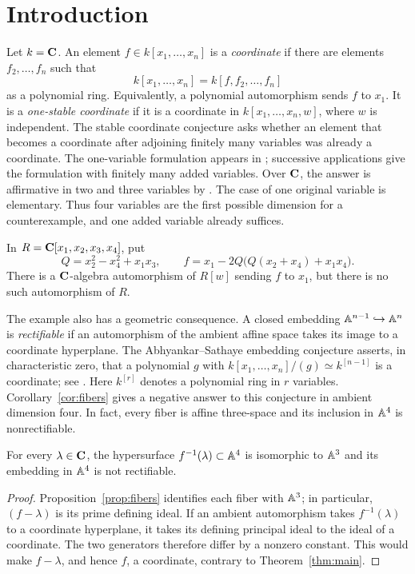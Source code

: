 \section{Introduction}\label{sec:introduction}
Let $k=\mathbf C$. An element $f\in k[x_1,\ldots,x_n]$ is a \emph{coordinate} if there are elements $f_2,\ldots,f_n$ such that
\[
 k[x_1,\ldots,x_n]=k[f,f_2,\ldots,f_n]
\]
as a polynomial ring. Equivalently, a polynomial automorphism sends $f$ to $x_1$. It is a \emph{one-stable coordinate} if it is a coordinate in $k[x_1,\ldots,x_n,w]$, where $w$ is independent. The stable coordinate conjecture asks whether an element that becomes a coordinate after adjoining finitely many variables was already a coordinate. The one-variable formulation appears in \cite[Conjecture~3]{ShpilrainYu2002}; successive applications give the formulation with finitely many added variables. Over $\mathbf C$, the answer is affirmative in two and three variables by \cite[Proposition~1.1(c)]{ShpilrainYu2002}. The case of one original variable is elementary. Thus four variables are the first possible dimension for a counterexample, and one added variable already suffices.

\begin{theorem}\label{thm:main}
In $R=\mathbf C[x_1,x_2,x_3,x_4]$, put
\begin{equation}\label{eq:explicit-counterexample}
 Q=x_2^2-x_4^2+x_1x_3,
 \qquad
 f=x_1-2Q\bigl(Q(x_2+x_4)+x_1x_4\bigr).
\end{equation}
There is a $\mathbf C$-algebra automorphism of $R[w]$ sending $f$ to $x_1$, but there is no such automorphism of $R$.
\end{theorem}

The example also has a geometric consequence. A closed embedding $\mathbb A^{n-1}\hookrightarrow\mathbb A^n$ is \emph{rectifiable} if an automorphism of the ambient affine space takes its image to a coordinate hyperplane. The Abhyankar--Sathaye embedding conjecture asserts, in characteristic zero, that a polynomial $g$ with $k[x_1,\ldots,x_n]/(g)\simeq k^{[n-1]}$ is a coordinate; see \cite[p.~8429]{BlancVanSanten2019}. Here $k^{[r]}$ denotes a polynomial ring in $r$ variables. Corollary~\ref{cor:fibers} gives a negative answer to this conjecture in ambient dimension four. In fact, every fiber is affine three-space and its inclusion in $\mathbb A^4$ is nonrectifiable.

\begin{corollary}\label{cor:fibers}
For every $\lambda\in\mathbf C$, the hypersurface $f^{-1}(\lambda)\subset\mathbb A^4$ is isomorphic to $\mathbb A^3$ and its embedding in $\mathbb A^4$ is not rectifiable.
\end{corollary}
\begin{proof}
Proposition~\ref{prop:fibers} identifies each fiber with $\mathbb A^3$; in particular, $(f-\lambda)$ is its prime defining ideal. If an ambient automorphism takes $f^{-1}(\lambda)$ to a coordinate hyperplane, it takes its defining principal ideal to the ideal of a coordinate. The two generators therefore differ by a nonzero constant. This would make $f-\lambda$, and hence $f$, a coordinate, contrary to Theorem~\ref{thm:main}.
\end{proof}

